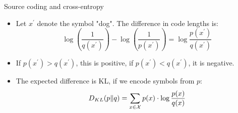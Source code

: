 \documentclass[11pt,compress,t,notes=noshow, xcolor=table]{beamer}
\begin{document}
\begin{vbframe} {Source coding and cross-entropy}
  \begin{itemize}
   \item Let $x^\prime$ denote the symbol "dog". The difference in code lengths is:
  $$ \log \left ( \frac{1}{q(x^\prime)} \right ) - \log \left( \frac{1}{p(x^\prime)} \right) = \log \frac{p(x^\prime)}{q(x^\prime)} $$
  
\item If $p(x^\prime) > q(x^\prime)$, this is positive, if $p(x^\prime) < q(x^\prime)$, it is negative. 
    \item The expected difference is KL, if we encode symbols from $p$:
  $$ D_{KL}(p \| q) = \sum_{x \in \mathcal{X}} p(x) \cdot \log \frac{p(x)}{q(x)} $$
  \end{itemize}

\end{vbframe}


\endlecture
\end{document}
